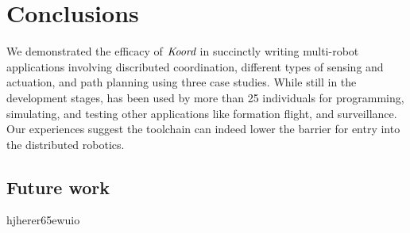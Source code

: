 \section{Conclusions}
\label{sec:conclusion}


We demonstrated the efficacy of $\emph{Koord}$ in succinctly writing multi-robot applications involving discributed coordination, different types of sensing and actuation, and path planning using three case studies. While still in the development stages, \CyPhyHouse has been used by more than 25 individuals for programming, simulating, and testing other applications like formation flight, and surveillance. Our experiences suggest the toolchain can indeed lower the barrier for entry into the distributed robotics.

\subsection{Future work}

     hjherer65ewuio











